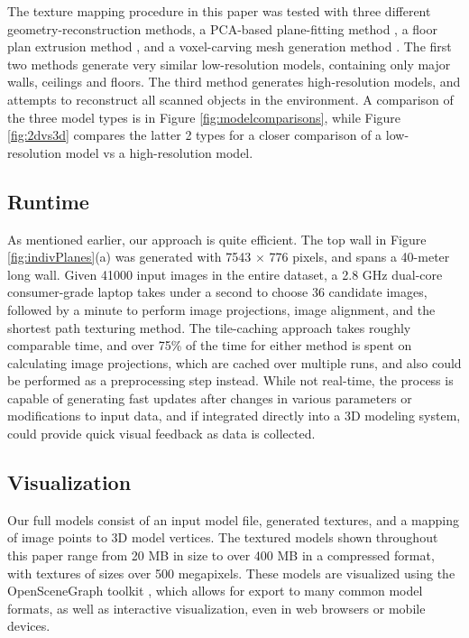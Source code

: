 \documentclass[]{spie}  %
\begin{document}
The texture mapping procedure in this paper was tested with three
different geometry-reconstruction methods, a PCA-based plane-fitting
method \cite{sanchez2012point}, a floor plan extrusion method
\cite{turnerfloorplan}, and a voxel-carving mesh generation method
\cite{turnerwatertight}. The first two methods generate very similar
low-resolution models, containing only major walls, ceilings and
floors. The third method generates high-resolution models, and
attempts to reconstruct all scanned objects in the environment. A
comparison of the three model types is in Figure
\ref{fig:modelcomparisons}, while Figure \ref{fig:2dvs3d} compares the
latter 2 types for a closer comparison of a low-resolution model vs a
high-resolution model. 


\subsection{Runtime}
As mentioned earlier, our approach is quite efficient. The top wall in
Figure \ref{fig:indivPlanes}(a) was generated with 7543 $\times$ 776
pixels, and spans a 40-meter long wall. Given 41000 input images in
the entire dataset, a 2.8 GHz dual-core consumer-grade laptop takes
under a second to choose 36 candidate images, followed by a minute to
perform image projections, image alignment, and the shortest path
texturing method. The tile-caching approach takes roughly comparable
time, and over 75\% of the time for either method is spent on
calculating image projections, which are cached over multiple runs,
and also could be performed as a preprocessing step instead. While not
real-time, the process is capable of generating fast updates after
changes in various parameters or modifications to input data, and if
integrated directly into a 3D modeling system, could provide quick
visual feedback as data is collected.


\subsection{Visualization}
Our full models consist of an input model file, generated textures,
and a mapping of image points to 3D model vertices. The textured
models shown throughout this paper range from 20 MB in size to over
400 MB in a compressed format, with textures of sizes over 500
megapixels. These models are visualized using the OpenSceneGraph
toolkit \cite{openscenegraph}, which allows for export to many common
model formats, as well as interactive visualization, even in web
browsers or mobile devices.
\end{document}
